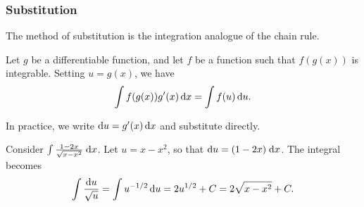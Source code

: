 \documentclass[a4paper]{article}
\begin{document}
\subsubsection*{Substitution}
The method of substitution is the integration analogue of the chain rule.

\begin{prop}
  Let $g$ be a differentiable function, and let $f$ be a function such that $f(g(x))$ is integrable. Setting $u = g(x)$, we have
  \[
    \int f(g(x))g'(x)\,\mathrm{d} x = \int f(u)\,\mathrm{d} u.
  \]
\end{prop}

In practice, we write $\mathrm{d} u = g'(x)\,\mathrm{d} x$ and substitute directly.

\begin{eg}
  Consider $\int \frac{1 - 2x}{\sqrt{x - x^2}}\;\mathrm{d} x$. Let $u = x - x^2$, so that $\mathrm{d} u = (1 - 2x)\;\mathrm{d} x$. The integral becomes
  \[
    \int \frac{\mathrm{d} u}{\sqrt{u}} = \int u^{-1/2}\,\mathrm{d} u = 2u^{1/2} + C = 2\sqrt{x - x^2} + C.
  \]
\end{eg}
\end{document}
